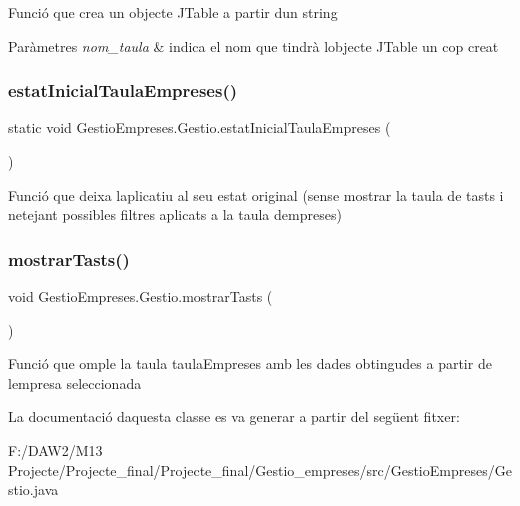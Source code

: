 Funció que crea un objecte J\+Table a partir d\textquotesingle{}un string 
\begin{DoxyParams}{Paràmetres}
{\em nom\+\_\+taula} & indica el nom que tindrà l\textquotesingle{}objecte J\+Table un cop creat \\
\hline
\end{DoxyParams}
\mbox{\label{class_gestio_empreses_1_1_gestio_a24868c8e57f3dc1b25d863a71080af44}} 
\subsubsection{\texorpdfstring{estatInicialTaulaEmpreses()}{estatInicialTaulaEmpreses()}}
{\footnotesize\ttfamily static void Gestio\+Empreses.\+Gestio.\+estat\+Inicial\+Taula\+Empreses (\begin{DoxyParamCaption}{ }\end{DoxyParamCaption})\hspace{0.3cm}{\ttfamily [static]}}

Funció que deixa l\textquotesingle{}aplicatiu al seu estat original (sense mostrar la taula de tasts i netejant possibles filtres aplicats a la taula d\textquotesingle{}empreses) \mbox{\label{class_gestio_empreses_1_1_gestio_a0c06f01a8b873ec71a0e35ed57dcc572}} 
\subsubsection{\texorpdfstring{mostrarTasts()}{mostrarTasts()}}
{\footnotesize\ttfamily void Gestio\+Empreses.\+Gestio.\+mostrar\+Tasts (\begin{DoxyParamCaption}{ }\end{DoxyParamCaption})}

Funció que omple la taula taula\+Empreses amb les dades obtingudes a partir de l\textquotesingle{}empresa seleccionada 

La documentació d\textquotesingle{}aquesta classe es va generar a partir del següent fitxer\+:\begin{DoxyCompactItemize}
\item 
F\+:/\+D\+A\+W2/\+M13 Projecte/\+Projecte\+\_\+final/\+Projecte\+\_\+final/\+Gestio\+\_\+empreses/src/\+Gestio\+Empreses/Gestio.\+java\end{DoxyCompactItemize}
